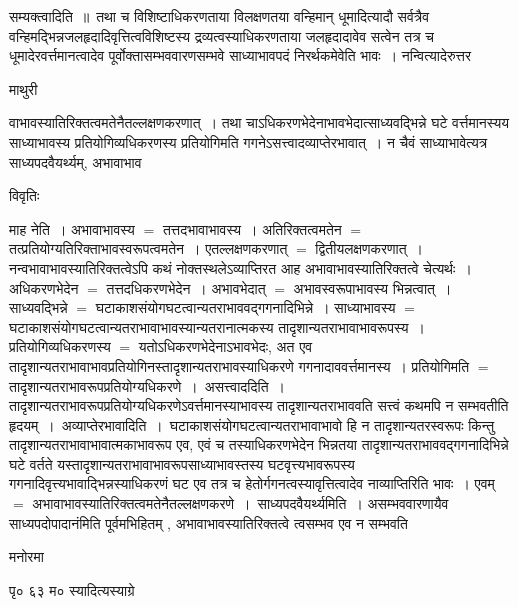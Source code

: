 \documentclass[10pt, openany]{book}
\begin{document}
{{\la सम्यक्त्वादिति~॥}~तथा च विशिष्टाधिकरणताया विलक्षणतया वन्हिमान् धूमादित्यादौ सर्वत्रैव वन्हिमद्भिन्नजलहृदादिवृत्तित्वविशिष्टस्य द्रव्यत्वस्याधिकरणताया जलहृदादावेव सत्वेन तत्र च धूमादेरवर्त्तमानत्वादेव पूर्वोक्तासम्भववारणसम्भवे साध्याभावपदं निरर्थकमेवेति भावः~। नन्वित्यादेरुत्तर
\newpage
\begin{center}  माथुरी  \end{center} {\la
वाभावस्यातिरिक्तत्वमतेनैतल्लक्षणकरणात्~। तथा चाऽधिकरणभेदेनाभावभेदात्साध्यवद्भिन्ने घटे वर्त्तमानस्यय साध्याभावस्य प्रतियोगिव्यधिकरणस्य प्रतियोगिमति गगनेऽसत्त्वादव्याप्तेरभावात्~। न चैवं साध्याभावेत्यत्र साध्यपदवैयर्थ्यम्, अभावाभाव}
\begin{center}     विवृतिः \end{center}
{\la माह  नेति~।} अभावाभावस्य $=$ तत्तदभावाभावस्य~। अतिरिक्तत्वमतेन $=$ तत्प्रतियोग्यतिरिक्ताभावस्वरूपत्वमतेन~। एतल्लक्षणकरणात् $=$ द्वितीयलक्षणकरणात्~। नन्वभावाभावस्यातिरिक्तत्वेऽपि कथं नोक्तस्थलेऽव्याप्तिरत आह अभावाभावस्यातिरिक्तत्वे चेत्यर्थः~। अधिकरणभेदेन $=$ तत्तदधिकरणभेदेन~। अभावभेदात् $=$ अभावस्वरूपाभावस्य भिन्नत्वात्~। साध्यवद्भिन्ने $=$ घटाकाशसंयोगघटत्वान्यतराभाववद्गगनादिभिन्ने~। साध्याभावस्य $=$ घटाकाशसंयोगघटत्वान्यतराभावाभावस्यान्यतरानात्मकस्य तादृशान्यतराभावाभावरूपस्य~। प्रतियोगिव्यधिकरणस्य $=$ यतोऽधिकरणभेदेनाऽभावभेदः, अत एव तादृशान्यतराभावाभावप्रतियोगिनस्तादृशान्यतराभावस्याधिकरणे गगनादाववर्त्तमानस्य~। प्रतियोगिमति $=$  तादृशान्यतराभावरूपप्रतियोग्यधिकरणे~।~{\la असत्त्वाददिति~।} तादृशान्यतराभावरूपप्रतियोग्यधिकरणेऽवर्त्तमानस्याभावस्य तादृशान्यतराभाववति सत्त्वं कथमपि न सम्भवतीति हृदयम्~।~{\la अव्याप्तेरभावादिति~।}~घटाकाशसंयोगघटत्वान्यतराभावाभावो हि न तादृशान्यतरस्वरूपः किन्तु तादृशान्यतराभावाभावात्मकाभावरूप एव, एवं च तस्याधिकरणभेदेन भिन्नतया तादृशान्यतराभाववद्गगनादिभिन्ने घटे वर्तते यस्तादृशान्यतराभावाभावरूपसाध्याभावस्तस्य घटवृत्त्यभावरूपस्य गगनादिवृत्त्यभावाद्भिन्नस्याधिकरणं घट एव तत्र च हेतोर्गगनत्वस्यावृत्तित्वादेव नाव्याप्तिरिति भावः~। एवम् $=$ अभावाभावस्यातिरिक्तत्वमतेनैतल्लक्षणकरणे~।~{\la साध्यपदवैयर्थ्यमिति~।} असम्भववारणायैव साध्यपदोपादानंमिति पूर्वमभिहितम् , अभावाभावस्यातिरिक्तत्वे त्वसम्भव एव न सम्भवति
\begin{center}   मनोरमा  \end{center}

पृ० ६३ म०  स्यादित्यस्याग्रे\textemdash\\


}
\end{document}

